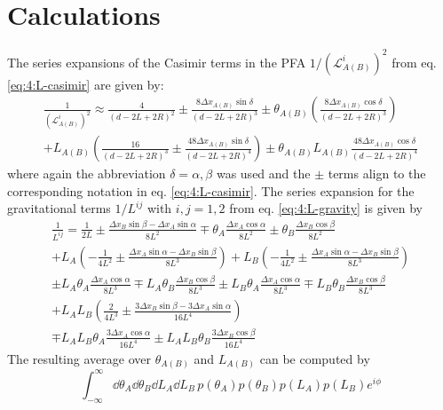 \chapter{Calculations}\label{apx:average-density}

The series expansions of the Casimir terms in the PFA $1/(\mathscr{L}^i_{A(B)})^2$ from eq. \eqref{eq:4:L-casimir} are given by:
\begin{multline}
  \frac{1}{(\mathscr{L}^i_{A(B)})^2} \approx \frac{4}{(d-2L+2R)^2} \pm \frac{8 \Delta x_{A(B)}\sin\delta}{(d-2L+2R)^3}
  \pm \theta_{A(B)}\left(\frac{8\Delta x_{A(B)} \cos\delta}{(d-2L+2R)^3}\right) \\
  + L_{A(B)}\left(\frac{16}{(d-2L+2R)^3} \pm \frac{48\Delta x_{A(B)} \sin\delta}{(d-2L+2R)^4}\right) \pm \theta_{A(B)}L_{A(B)}\frac{48\Delta x_{A(B)} \cos\delta}{(d-2L+2R)^4}
\end{multline}
where again the abbreviation $\delta = \alpha,\beta$ was used and the $\pm$ terms align to the corresponding notation in eq. \eqref{eq:4:L-casimir}. The series expansion for the gravitational terms $1/L^{ij}$ with $i,j = 1,2$ from eq. \eqref{eq:4:L-gravity} is given by
\begin{multline}
  \frac{1}{L^{ij}} = \frac{1}{2L} \pm \frac{\Delta x_B \sin\beta - \Delta x_A \sin\alpha}{8L^2} \mp \theta_A\frac{\Delta x_A\cos\alpha}{8L^2} \pm \theta_B\frac{\Delta x_B\cos\beta}{8L^2} \\
  + L_A \left(-\frac{1}{4L^2} \pm \frac{\Delta x_A \sin\alpha-\Delta x_B \sin\beta}{8L^3}\right)
  + L_B \left(-\frac{1}{4L^2} \pm \frac{\Delta x_A \sin\alpha-\Delta x_B \sin\beta}{8L^3}\right) \\
  \pm L_A \theta_A \frac{\Delta x_A \cos\alpha}{8L^3} \mp L_A \theta_B \frac{\Delta x_B \cos\beta}{8L^3}
  \pm L_B \theta_A \frac{\Delta x_A \cos\alpha}{8L^3} \mp L_B \theta_B \frac{\Delta x_B \cos\beta}{8L^3} \\
  + L_A L_B \left(\frac{2}{4L^3} \pm \frac{3\Delta x_B \sin\beta - 3 \Delta x_A \sin\alpha}{16L^4}\right) \\
  \mp L_A L_B \theta_A \frac{3 \Delta x_A \cos\alpha}{16L^4} \pm L_A L_B \theta_B \frac{3 \Delta x_B \cos\beta}{16L^4}
\end{multline}
The resulting average over $\theta_{A(B)}$ and $L_{A(B)}$ can be computed by
\begin{equation}\label{eq:apx:average-density-element}
  \int_{-\infty}^{\infty} \dd \theta_A \dd \theta_B \dd L_A \dd L_B \, p(\theta_A) p(\theta_B) p(L_A) p(L_B) e^{i \phi}
\end{equation}
